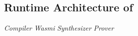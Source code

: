 \subsection{Runtime Architecture of \zkwasm}
\noindent\emph{Compiler}
\noindent\emph{Wasmi}
\noindent\emph{Synthesizer}
\noindent\emph{Prover}













